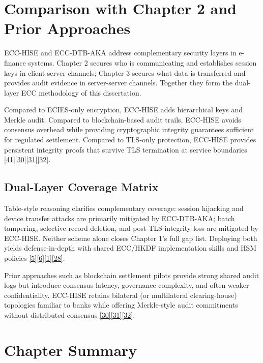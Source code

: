 \section{Comparison with Chapter 2 and Prior Approaches}

\indent ECC-HISE and ECC-DTB-AKA address complementary security layers in e-finance systems. Chapter 2 secures who is communicating and establishes session keys in client-server channels; Chapter 3 secures what data is transferred and provides audit evidence in server-server channels. Together they form the dual-layer ECC methodology of this dissertation.

\indent Compared to ECIES-only encryption, ECC-HISE adds hierarchical keys and Merkle audit. Compared to blockchain-based audit trails, ECC-HISE avoids consensus overhead while providing cryptographic integrity guarantees sufficient for regulated settlement. Compared to TLS-only protection, ECC-HISE provides persistent integrity proofs that survive TLS termination at service boundaries \hyperref[ref:41]{[41]}\hyperref[ref:30]{[30]}\hyperref[ref:31]{[31]}\hyperref[ref:32]{[32]}.

\subsection{Dual-Layer Coverage Matrix}

\indent Table-style reasoning clarifies complementary coverage: session hijacking and device transfer attacks are primarily mitigated by ECC-DTB-AKA; batch tampering, selective record deletion, and post-TLS integrity loss are mitigated by ECC-HISE. Neither scheme alone closes Chapter 1's full gap list. Deploying both yields defense-in-depth with shared ECC/HKDF implementation skills and HSM policies \hyperref[ref:5]{[5]}\hyperref[ref:6]{[6]}\hyperref[ref:1]{[1]}\hyperref[ref:28]{[28]}.

\indent Prior approaches such as blockchain settlement pilots provide strong shared audit logs but introduce consensus latency, governance complexity, and often weaker confidentiality. ECC-HISE retains bilateral (or multilateral clearing-house) topologies familiar to banks while offering Merkle-style audit commitments without distributed consensus \hyperref[ref:30]{[30]}\hyperref[ref:31]{[31]}\hyperref[ref:32]{[32]}.

\section{Chapter Summary}

